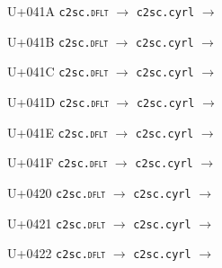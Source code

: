 \documentclass{article}
\begin{document}
\begin{substitutions}
\goodbreak

U+041A  \linebreak
    \texttt{c2sc.\textsc{dflt}} $\to$  \linebreak
    \texttt{c2sc.cyrl} $\to$  

\goodbreak

U+041B  \linebreak
    \texttt{c2sc.\textsc{dflt}} $\to$  \linebreak
    \texttt{c2sc.cyrl} $\to$  

\goodbreak

U+041C  \linebreak
    \texttt{c2sc.\textsc{dflt}} $\to$  \linebreak
    \texttt{c2sc.cyrl} $\to$  

\goodbreak

U+041D  \linebreak
    \texttt{c2sc.\textsc{dflt}} $\to$  \linebreak
    \texttt{c2sc.cyrl} $\to$  

\goodbreak

U+041E  \linebreak
    \texttt{c2sc.\textsc{dflt}} $\to$  \linebreak
    \texttt{c2sc.cyrl} $\to$  

\goodbreak

U+041F  \linebreak
    \texttt{c2sc.\textsc{dflt}} $\to$  \linebreak
    \texttt{c2sc.cyrl} $\to$  

\goodbreak

U+0420  \linebreak
    \texttt{c2sc.\textsc{dflt}} $\to$  \linebreak
    \texttt{c2sc.cyrl} $\to$  

\goodbreak

U+0421  \linebreak
    \texttt{c2sc.\textsc{dflt}} $\to$  \linebreak
    \texttt{c2sc.cyrl} $\to$  

\goodbreak

U+0422  \linebreak
    \texttt{c2sc.\textsc{dflt}} $\to$  \linebreak
    \texttt{c2sc.cyrl} $\to$  


\end{substitutions}
\end{document}
